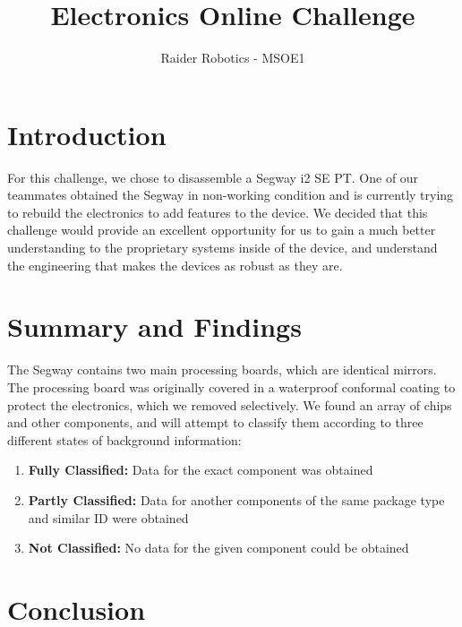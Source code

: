 \documentclass[]{formalLabReport}
\begin{document}
\title{Electronics Online Challenge}
\author{Raider Robotics - MSOE1}

\maketitle

\tableofcontents

\newpage

\section{Introduction}
For this challenge, we chose to disassemble a Segway i2 SE PT. One of our teammates obtained 
the Segway in non-working condition and is currently trying to rebuild the electronics to add
features to the device. We decided that this challenge would provide an excellent opportunity for
us to gain a much better understanding to the proprietary systems inside of the device, and understand
the engineering that makes the devices as robust as they are.

\section{Summary and Findings}
The Segway contains two main processing boards, which are identical mirrors. The processing board was
originally covered in a waterproof conformal coating to protect the electronics, which we removed selectively.
We found an array of chips and other components, and will attempt to classify them according to 
three different states of background information:
\begin{enumerate}
    \item \textbf{Fully Classified:} Data for the exact component was obtained
    \item \textbf{Partly Classified:} Data for another components of the same package type and similar ID were obtained
    \item \textbf{Not Classified:} No data for the given component could be obtained
\end{enumerate}

\section{Conclusion}
\end{document}

